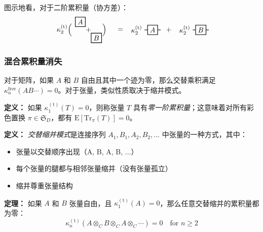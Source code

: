 图示地看，对于二阶累积量（协方差）：
\[
\begin{tikzpicture}[baseline=-.5em, scale=0.8]
   \node at (-1,0) {$\kappa_2^{(\mathrm{t})}\Big($};
   \node[draw, thick] (A) at (0,.5) {$A$};
   \node at (.5,0) {$+$};
   \node[draw, thick] (B) at (1,-.5) {$B$};
   \node at (1.5,0) {$\Big)$};
   
   \node at (2.5,0) {$=$};
   
   \node at (3.5,0) {$\kappa_2^{(\mathrm{t})}$};
   \node[draw, thick] (A2) at (4.5,0) {$A$};
   \draw[thick] (A2) -- ++(-.5,0);
   \draw[thick] (A2) -- ++(.5,0);
   
   \node at (5.5,0) {$+$};
   
   \node at (6.5,0) {$\kappa_2^{(\mathrm{t})}$};
   \node[draw, thick] (B2) at (7.5,0) {$B$};
   \draw[thick] (B2) -- ++(-.5,0);
   \draw[thick] (B2) -- ++(.5,0);
\end{tikzpicture}
\]

\subsubsection{混合累积量消失}

对于矩阵，如果 $A$ 和 $B$ 自由且其中一个迹为零，那么交替乘积满足 $\kappa_n^{\text{free}}(AB\cdots) = 0$。对于张量，类似性质取决于缩并模式。

\textbf{定义：} 如果 $\kappa_1^{(\mathrm{t})}(T) = 0$，则称张量 $T$ 具有\emph{零一阶累积量}；这意味着对所有彩色置换 $\pi \in \mathfrak{S}_D$，都有 $\mathrm{E}[\mathrm{Tr}_{\pi}(T)] = 0$。

\textbf{定义：} \emph{交替缩并模式}是连接序列 $A_1, B_1, A_2, B_2, \ldots$ 中张量的一种方式，其中：
\begin{itemize}
\item 张量以交替顺序出现（A, B, A, B, ...）
\item 每个张量的腿都与相邻张量缩并（没有张量孤立）
\item 缩并尊重张量结构
\end{itemize}

\textbf{定理：} 如果 $A$ 和 $B$ 张量自由，且 $\kappa_1^{(\mathrm{t})}(A) = 0$，那么任意交替缩并的累积量都为零：
\[
   \kappa_n^{(\mathrm{t})}(A \otimes_C B \otimes_C A \otimes_C \cdots) = 0 \quad \text{for } n \geq 2
\]

